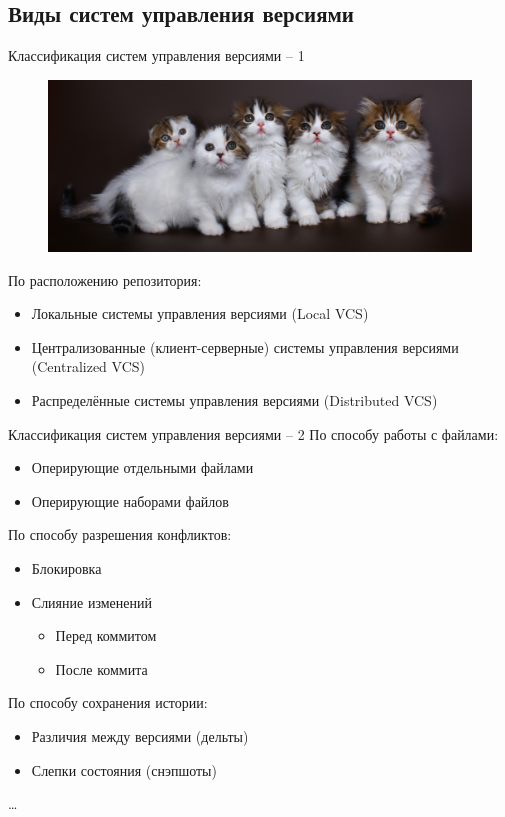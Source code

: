 \documentclass[presentation]{beamer}
\begin{document}


\subsection{Виды систем управления версиями}

\begin{frame}{Классификация систем управления версиями -- 1}
  \begin{figure}[htb]
    \centering
    \includegraphics[width=.9\textwidth]{scottish-kitten}
  \end{figure}

  По расположению репозитория:
  \begin{itemize}
  \item \alert{Локальные} системы управления версиями (Local VCS)
  \item \alert{Централизованные} (клиент-серверные) системы управления
    версиями (Centralized VCS)
  \item \alert{Распределённые} системы управления версиями (Distributed VCS)
  \end{itemize}
\end{frame}

\begin{frame}{Классификация систем управления версиями -- 2}
  По способу работы с файлами:
  \begin{itemize}
  \item Оперирующие отдельными файлами
  \item Оперирующие наборами файлов
  \end{itemize}

  \medskip

  По способу разрешения конфликтов:
  \begin{itemize}
  \item Блокировка
  \item Слияние изменений
    \begin{itemize}
    \item Перед коммитом
    \item После коммита
    \end{itemize}
  \end{itemize}

  \medskip

  По способу сохранения истории:
  \begin{itemize}
  \item Различия между версиями (дельты)
  \item Слепки состояния (снэпшоты)
  \end{itemize}

  \ldots
\end{frame}
\end{document}
